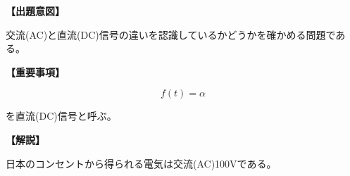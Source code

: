 \noindent \textbf{【出題意図】}

\noindent 交流(AC)と直流(DC)信号の違いを認識しているかどうかを確かめる問題である。

\vspace{1em}
\noindent \textbf{【重要事項】}

\[
f(t) = \alpha
\]

\medskip
\noindent を直流(DC)信号と呼ぶ。


\vspace{1em}
\noindent \textbf{【解説】}

\noindent 日本のコンセントから得られる電気は交流(AC)100Vである。

